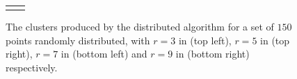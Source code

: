 \begin{figure}[htpb]
\begin{center}
\begin{tabular}{cc}
\vspace*{-6mm}
\end{tabular}
\end{center}
	\caption{\footnotesize The clusters produced by the distributed algorithm for a set of $150$ points randomly distributed, with $r=3$ in (top left), $r=5$ in (top right), $r=7$ in (bottom left) and $r=9$ in (bottom right) respectively. }
	\label{fig:snapshot}
\end{figure}

%
%
%
%
%
%










